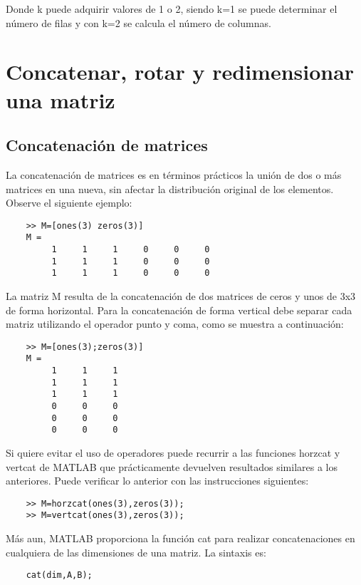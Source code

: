 Donde k puede adquirir valores de 1 o 2, siendo k=1 se puede determinar el número de filas 
y con k=2 se calcula el número de columnas.


\section{Concatenar, rotar y redimensionar una matriz}

\subsection{Concatenación de matrices}

La concatenación de matrices es en términos prácticos la unión de dos o más matrices en 
una nueva, sin afectar la distribución original de los elementos. Observe el siguiente ejemplo:

\begin{verbatim}
	>> M=[ones(3) zeros(3)]
	M =
	     1     1     1     0     0     0
	     1     1     1     0     0     0
	     1     1     1     0     0     0
\end{verbatim}

La matriz M resulta de la concatenación de dos matrices de ceros y unos de 3x3 
de forma horizontal. Para la concatenación de forma vertical debe separar cada 
matriz utilizando el operador punto y coma, como se muestra a continuación:

\begin{verbatim}
	>> M=[ones(3);zeros(3)]
	M =
	     1     1     1
	     1     1     1
	     1     1     1
	     0     0     0
	     0     0     0
	     0     0     0
\end{verbatim}

Si quiere evitar el uso de operadores puede recurrir a las funciones horzcat 
y vertcat de MATLAB que prácticamente devuelven resultados similares a los 
anteriores. Puede verificar lo anterior con las instrucciones siguientes:

\begin{verbatim}
	>> M=horzcat(ones(3),zeros(3));
	>> M=vertcat(ones(3),zeros(3));
\end{verbatim}

Más aun, MATLAB proporciona la función cat para realizar concatenaciones en 
cualquiera de las dimensiones de una matriz. La sintaxis es:

\begin{verbatim}
	cat(dim,A,B);
\end{verbatim}

